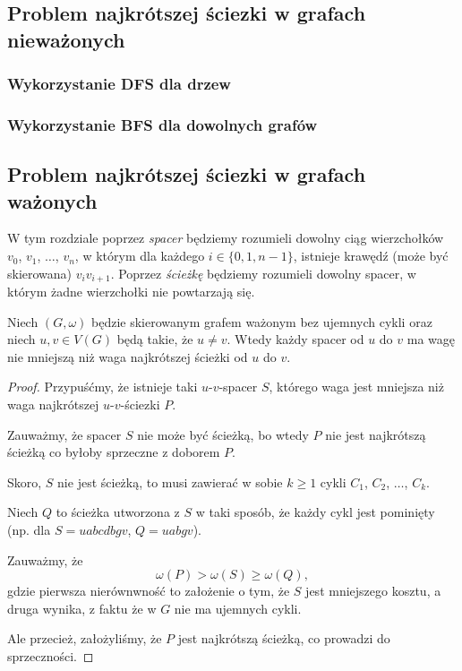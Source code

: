 \subsection{Problem najkrótszej ściezki w grafach nieważonych}
\subsubsection{Wykorzystanie DFS dla drzew}
\subsubsection{Wykorzystanie BFS dla dowolnych grafów}

\subsection{Problem najkrótszej ściezki w grafach ważonych}

W tym rozdziale poprzez \textit{spacer} będziemy rozumieli dowolny
ciąg wierzchołków $v_0$, $v_1$, $\dots$, $v_{n}$, w 
którym dla każdego $i \in \{0, 1, n-1\}$,
istnieje krawędź (może być skierowana)
$v_iv_{i+1}$. Poprzez \textit{ścieżkę}
będziemy rozumieli dowolny spacer, w którym
żadne wierzchołki nie powtarzają się.

\begin{lemma}
	Niech $(G,\omega)$ będzie skierowanym grafem ważonym 
	bez ujemnych cykli oraz niech $u,v \in V(G)$ będą
	takie, że $u \neq v$. Wtedy
	każdy spacer od $u$ do $v$ ma wagę nie 
	mniejszą niż waga
	najkrótszej ścieżki od $u$ do $v$.
	\begin{proof}
		Przypuśćmy, że istnieje taki $u$-$v$-spacer $S$, 
		którego waga jest mniejsza niż waga najkrótszej
		$u$-$v$-ściezki $P$. 
		
		Zauważmy, że spacer $S$ nie może być ścieżką, 
		bo wtedy $P$ nie jest najkrótszą ścieżką co 
		byłoby sprzeczne z doborem $P$.
		
		Skoro, $S$ nie jest ścieżką, to musi zawierać
		w sobie $k\geq 1$ cykli $C_1$, $C_2$, $\dots$, $C_k$. 
		
		Niech $Q$ to ścieżka utworzona z $S$ w taki sposób,
		że każdy cykl jest pominięty (np. dla $S=uabcdbgv$, 
		$Q=uabgv$).
		
		Zauważmy, że
		\[\omega(P) > \omega(S) \geq \omega(Q),\]
		gdzie pierwsza nierównwność to założenie o
		tym, że $S$ jest mniejszego kosztu, a druga wynika,
		z faktu że w $G$ nie ma ujemnych cykli.
		
		Ale przecież, założyliśmy, że $P$ jest najkrótszą ścieżką,
		co prowadzi do sprzeczności.
		
	\end{proof}
	\label{minpath_walk}
\end{lemma}

